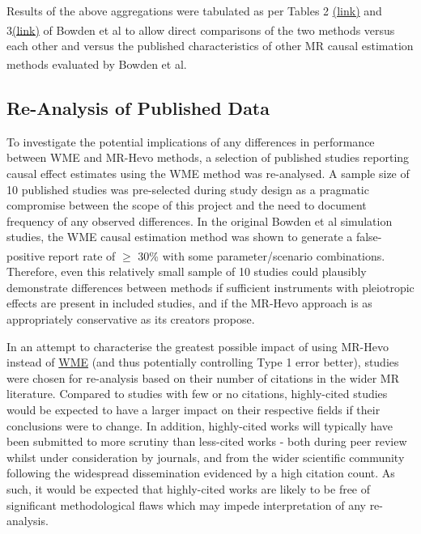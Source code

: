 \documentclass[
]{article}
\begin{document}
Results of the above aggregations were tabulated as per Tables 2 \href{https://pmc.ncbi.nlm.nih.gov/articles/PMC4849733/table/gepi21965-tbl-0002/}{(link)} and 3\href{https://pmc.ncbi.nlm.nih.gov/articles/PMC4849733/table/gepi21965-tbl-0003/}{(link)} of Bowden et al\textsuperscript{} to allow direct comparisons of the two methods versus each other and versus the published characteristics of other MR causal estimation methods evaluated by Bowden et al\textsuperscript{}.

\subsection{Re-Analysis of Published Data}\label{re-analysis-of-published-data}

To investigate the potential implications of any differences in performance between WME and MR-Hevo methods, a selection of published studies reporting causal effect estimates using the WME method was re-analysed. A sample size of 10 published studies was pre-selected during study design as a pragmatic compromise between the scope of this project and the need to document frequency of any observed differences. In the original Bowden et al simulation studies, the WME causal estimation method was shown to generate a false-positive report rate of \(\ge\) 30\% with some parameter/scenario combinations\textsuperscript{}. Therefore, even this relatively small sample of 10 studies could plausibly demonstrate differences between methods if sufficient instruments with pleiotropic effects are present in included studies, and if the MR-Hevo approach is as appropriately conservative as its creators propose.

In an attempt to characterise the greatest possible impact of using MR-Hevo instead of \hyperref[acronyms_WME]{WME} (and thus potentially controlling Type 1 error better), studies were chosen for re-analysis based on their number of citations in the wider MR literature. Compared to studies with few or no citations, highly-cited studies would be expected to have a larger impact on their respective fields if their conclusions were to change. In addition, highly-cited works will typically have been submitted to more scrutiny than less-cited works - both during peer review whilst under consideration by journals, and from the wider scientific community following the widespread dissemination evidenced by a high citation count. As such, it would be expected that highly-cited works are likely to be free of significant methodological flaws which may impede interpretation of any re-analysis.
\end{document}
